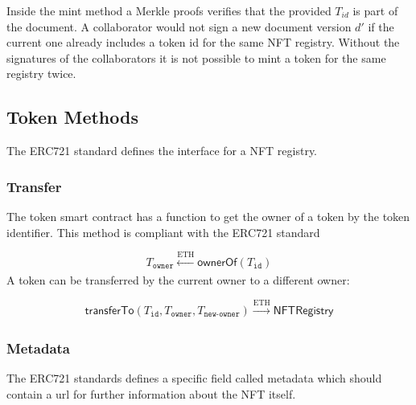 Inside the mint method a Merkle proofs verifies that the provided $T_{id}$ is part of the document. A collaborator would not sign a new document version $d'$ if the current one already includes a token id for the same NFT registry. Without the signatures of the collaborators it is not possible to mint a token for the same registry twice.

\subsection{Token Methods}
The ERC721 standard defines the interface for a NFT registry.
\subsubsection{Transfer}
The token smart contract has a function to get the owner of a token by the token identifier. This method is compliant with the ERC721 standard

\begin{equation}
 T_{\mathtt{owner}} \xleftarrow[]{\text{ETH}} \mathsf{ownerOf}(T_{\texttt{id}})
\end{equation}
A token can be transferred by the current owner to a different owner:

\begin{equation}
\mathsf{transferTo}(T_{\texttt{id}},T_{\texttt{owner}},T_{\texttt{new-owner}}) \xrightarrow[]{\text{ETH}}  \mathsf{NFTRegistry}
\end{equation}

\subsubsection{Metadata}
The ERC721 standards defines a specific field called metadata which should contain a url for further information about the NFT itself.

